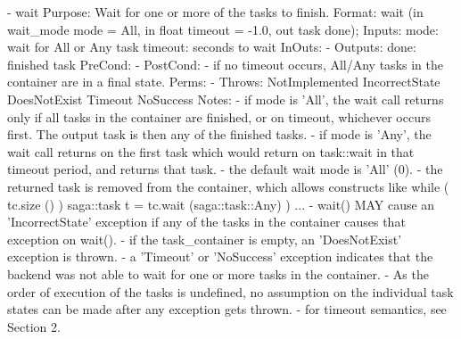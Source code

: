 \begin{myspec}
 
    - wait
      Purpose:  Wait for one or more of the tasks to finish.
      Format:   wait                 (in  wait_mode mode = All,
                                      in  float  timeout = -1.0,
                                      out task   done);
      Inputs:   mode:                 wait for All or Any task
                timeout:              seconds to wait
      InOuts:   -
      Outputs:  done:                 finished task
      PreCond:  -
      PostCond: - if no timeout occurs, All/Any tasks in the 
                  container are in a final state.
      Perms:    -
      Throws:   NotImplemented
                IncorrectState
                DoesNotExist
                Timeout
                NoSuccess
      Notes:    - if mode is 'All', the wait call returns only
                  if all tasks in the container are finished,
                  or on timeout, whichever occurs first.
                  The output task is then any of the finished
                  tasks.
                - if mode is 'Any', the wait call returns on the
                  first task which would return on task::wait in
                  that timeout period, and returns that task.
                - the default wait mode is 'All' (0).
                - the returned task is removed from the
                  container, which allows constructs like
                    while ( tc.size () )
                    { 
                       saga::task t = tc.wait (saga::task::Any) ) 
                       ... 
                    }
                - wait() MAY cause an 'IncorrectState' exception
                  if any of the tasks in the container causes 
                  that exception on wait().
                - if the task_container is empty, an
                  'DoesNotExist' exception is thrown.
                - a 'Timeout' or 'NoSuccess' exception indicates
                  that the backend was not able to wait for one 
                  or more tasks in the container.
                - As the order of execution of the tasks is
                  undefined, no assumption on the individual
                  task states can be made after any
                  exception gets thrown.
                - for timeout semantics, see Section 2.
 

\end{myspec}
